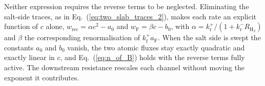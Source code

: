 \documentclass[5p]{elsarticle}
\begin{document}
Neither expression requires the reverse terms to be neglected.
Eliminating the salt-side traces, as in Eq.~(\ref{eq:two_slab_traces_2}), makes each rate an explicit function of $c$ alone, $w_\mathrm{rec} = \alpha c^{2} - a_0$ and $w_\mathrm{F} = \beta c - b_0$, with $\alpha = k_\mathrm{r}^{+}/(1 + k_\mathrm{r}^{-}R_\mathrm{H_2})$ and $\beta$ the corresponding renormalisation of $k_\mathrm{f}^{+}a_\mathrm{F}$.
When the salt side is swept the constants $a_0$ and $b_0$ vanish, the two atomic fluxes stay exactly quadratic and exactly linear in $c$, and Eq.~(\ref{eq:n_of_B}) holds with the reverse terms fully active.
The downstream resistance rescales each channel without moving the exponent it contributes.



\end{document}
